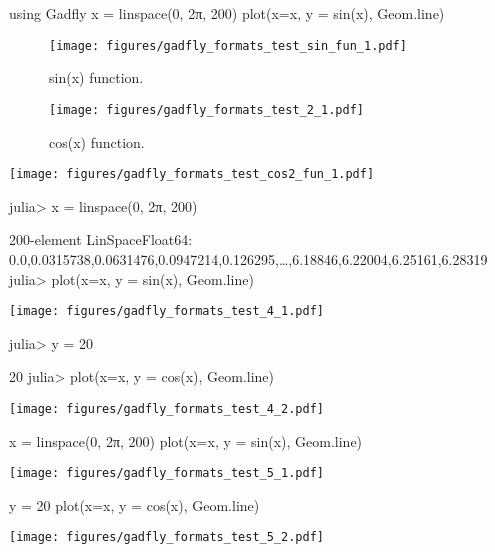 \begin{juliacode}
using Gadfly
x = linspace(0, 2π, 200)
plot(x=x, y = sin(x), Geom.line)
\end{juliacode}
\begin{figure}[ht]
\center
\texttt{[image: figures/gadfly\_formats\_test\_sin\_fun\_1.pdf]}
\caption{sin(x) function.}
\label{fig:sin_fun}
\end{figure}

\begin{figure}[htpb]
\center
\texttt{[image: figures/gadfly\_formats\_test\_2\_1.pdf]}
\caption{cos(x) function.}
\end{figure}

\texttt{[image: figures/gadfly\_formats\_test\_cos2\_fun\_1.pdf]}

\begin{juliaterm}
julia> x = linspace(0, 2π, 200)

200-element LinSpace{Float64}:
 0.0,0.0315738,0.0631476,0.0947214,0.126295,…,6.18846,6.22004,6.25161,6.28319
julia> plot(x=x, y = sin(x), Geom.line)

\end{juliaterm}
\texttt{[image: figures/gadfly\_formats\_test\_4\_1.pdf]}

\begin{juliaterm}
julia> y = 20

20
julia> plot(x=x, y = cos(x), Geom.line)
\end{juliaterm}
\texttt{[image: figures/gadfly\_formats\_test\_4\_2.pdf]}

\begin{juliacode}
x = linspace(0, 2π, 200)
plot(x=x, y = sin(x), Geom.line)
\end{juliacode}
\texttt{[image: figures/gadfly\_formats\_test\_5\_1.pdf]}

\begin{juliacode}
y = 20
plot(x=x, y = cos(x), Geom.line)
\end{juliacode}
\texttt{[image: figures/gadfly\_formats\_test\_5\_2.pdf]}
